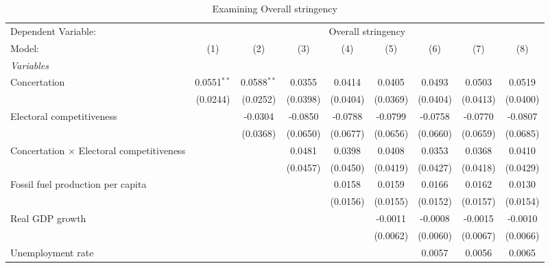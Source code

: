 
\begin{table}[htbp]
   \caption{Examining Overall stringency}
   \centering
   \begin{tabular}{lcccccccc}
      \tabularnewline \midrule \midrule
      Dependent Variable: & \multicolumn{8}{c}{Overall stringency}\\
      Model:                                           & (1)           & (2)           & (3)      & (4)      & (5)      & (6)      & (7)      & (8)\\  
      \midrule
      \emph{Variables}\\
      Concertation                                     & 0.0551$^{**}$ & 0.0588$^{**}$ & 0.0355   & 0.0414   & 0.0405   & 0.0493   & 0.0503   & 0.0519\\   
                                                       & (0.0244)      & (0.0252)      & (0.0398) & (0.0404) & (0.0369) & (0.0404) & (0.0413) & (0.0400)\\   
      Electoral competitiveness                        &               & -0.0304       & -0.0850  & -0.0788  & -0.0799  & -0.0758  & -0.0770  & -0.0807\\   
                                                       &               & (0.0368)      & (0.0650) & (0.0677) & (0.0656) & (0.0660) & (0.0659) & (0.0685)\\   
      Concertation $\times$ Electoral competitiveness  &               &               & 0.0481   & 0.0398   & 0.0408   & 0.0353   & 0.0368   & 0.0410\\   
                                                       &               &               & (0.0457) & (0.0450) & (0.0419) & (0.0427) & (0.0418) & (0.0429)\\   
      Fossil fuel production per capita                &               &               &          & 0.0158   & 0.0159   & 0.0166   & 0.0162   & 0.0130\\   
                                                       &               &               &          & (0.0156) & (0.0155) & (0.0152) & (0.0157) & (0.0154)\\   
      Real GDP growth                                  &               &               &          &          & -0.0011  & -0.0008  & -0.0015  & -0.0010\\   
                                                       &               &               &          &          & (0.0062) & (0.0060) & (0.0067) & (0.0066)\\   
      Unemployment rate                                &               &               &          &          &          & 0.0057   & 0.0056   & 0.0065\\   

\end{tabular}
\end{table}
